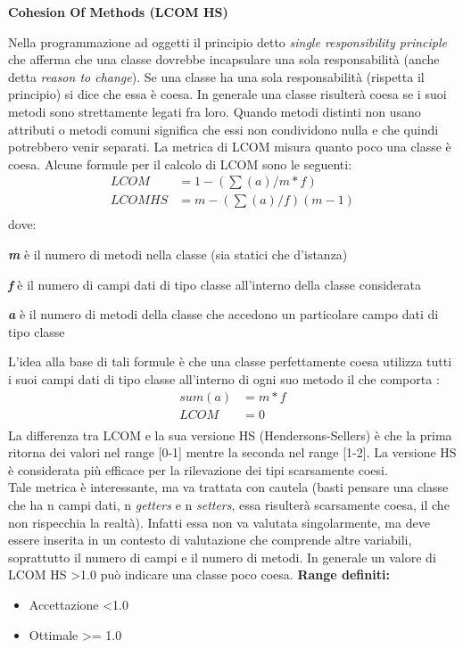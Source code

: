 {\large \textbf{Cohesion Of Methods (LCOM HS)}\par} 
Nella programmazione ad oggetti il principio detto \textit{single responsibility principle} che afferma che una classe dovrebbe incapsulare una sola responsabilità (anche detta \textit{reason to change}). Se una classe ha una sola responsabilità (rispetta il principio) si dice che essa è coesa. In generale una classe risulterà coesa se i suoi metodi sono strettamente legati fra loro. Quando metodi distinti non usano attributi o metodi comuni significa che essi non condividono nulla e che quindi potrebbero venir separati. La metrica di LCOM misura quanto poco una classe è coesa.
Alcune formule per il calcolo di LCOM sono le seguenti: \\
\begin{equation}
\begin{split}
LCOM& = 1-(\sum(a)/m*f) \\
LCOM HS& = m-(\sum(a)/f)(m-1) \\
\end{split}
\end{equation}
dove:
\begin{description}
	\item \textbf{\textit{m}} è il numero di metodi nella classe (sia statici che d'istanza)
	\item \textbf{\textit{f}} è il numero di campi dati di tipo classe all'interno della classe considerata
	\item \textbf{\textit{a}} è il numero di metodi della classe che accedono un particolare campo dati di tipo classe
\end{description}
L'idea alla base di tali formule è che una classe perfettamente coesa utilizza tutti i suoi campi dati di tipo classe all'interno di ogni suo metodo il che comporta :
\begin{equation}
\begin{split}
sum(a)& = m*f \\
LCOM& = 0\\
\end{split}
\end{equation}
La differenza tra LCOM e la sua versione HS (Hendersons-Sellers) è che la prima ritorna dei valori nel range [0-1] mentre la seconda nel range [1-2]. La versione HS è considerata più efficace per la rilevazione dei tipi scarsamente coesi. \\
Tale metrica è interessante, ma va trattata con cautela (basti pensare una classe che ha n campi dati, n \textit{getters} e n \textit{setters}, essa risulterà scarsamente coesa, il che non rispecchia la realtà). Infatti essa non va valutata singolarmente, ma deve essere inserita in un contesto di valutazione che comprende altre variabili, soprattutto il numero di campi e il numero di metodi. In generale un valore di LCOM HS \textgreater 1.0 può indicare una classe poco coesa.
\textbf{Range definiti:}
\begin{itemize}
	\item Accettazione \textless  1.0
	\item Ottimale \textgreater = 1.0
\end{itemize}

